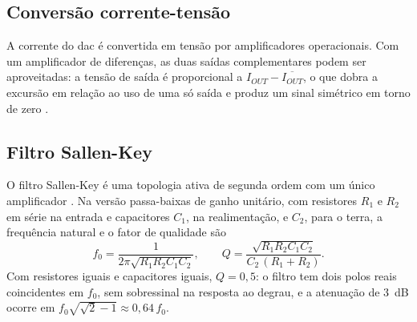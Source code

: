 \subsection{Conversão corrente-tensão}

A corrente do \ac{dac} é convertida em tensão por amplificadores operacionais. Com um amplificador de diferenças, as duas saídas complementares podem ser aproveitadas: a tensão de saída é proporcional a \(I_{OUT} - \overline{I_{OUT}}\), o que dobra a excursão em relação ao uso de uma só saída e produz um sinal simétrico em torno de zero \cites{ti2013,sedra2015}.

\subsection{Filtro Sallen-Key}

O filtro Sallen-Key é uma topologia ativa de segunda ordem com um único amplificador \cite{sallen1955}. Na versão passa-baixas de ganho unitário, com resistores \(R_1\) e \(R_2\) em série na entrada e capacitores \(C_1\), na realimentação, e \(C_2\), para o terra, a frequência natural e o fator de qualidade são \cite{sedra2015}
\begin{equation}\label{eq:sallen_key}
	f_0 = \frac{1}{2\pi\sqrt{R_1 R_2 C_1 C_2}}, \qquad Q = \frac{\sqrt{R_1 R_2 C_1 C_2}}{C_2\,(R_1 + R_2)}.
\end{equation}
Com resistores iguais e capacitores iguais, \(Q = 0{,}5\): o filtro tem dois polos reais coincidentes em \(f_0\), sem sobressinal na resposta ao degrau, e a atenuação de 3~dB ocorre em \(f_0\sqrt{\sqrt{2}-1} \approx 0{,}64\,f_0\).
